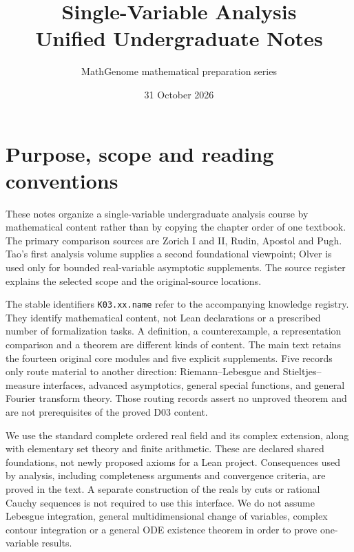 \documentclass[11pt,oneside,a4paper]{book}
\theoremstyle{definition}
\theoremstyle{remark}
\begin{document}
\frontmatter
\title{Single-Variable Analysis\\Unified Undergraduate Notes}
\author{MathGenome mathematical preparation series}
\date{31 October 2026}
\hypersetup{pageanchor=false}
\maketitle
\clearpage
{}
\hypersetup{pageanchor=true}

\chapter*{Purpose, scope and reading conventions}
These notes organize a single-variable undergraduate analysis course by mathematical
content rather than by copying the chapter order of one textbook. The primary
comparison sources are Zorich I and II, Rudin, Apostol and Pugh. Tao's first
analysis volume supplies a second foundational viewpoint; Olver is used only
for bounded real-variable asymptotic supplements. The source register explains
the selected scope and the original-source locations.

The stable identifiers \texttt{K03.xx.name} refer to the accompanying knowledge
registry. They identify mathematical content, not Lean declarations or a prescribed
number of formalization tasks. A definition, a counterexample, a representation
comparison and a theorem are different kinds of content. The main text retains
the fourteen original core modules and five explicit supplements. Five records
only route material to another direction: Riemann--Lebesgue and Stieltjes--measure
interfaces, advanced asymptotics, general special functions, and general Fourier
transform theory. Those routing records assert no unproved theorem and are not
prerequisites of the proved D03 content.

We use the standard complete ordered real field and its complex extension, along
with elementary set theory and finite arithmetic. These are declared shared
foundations, not newly proposed axioms for a Lean project. Consequences used by
analysis, including completeness arguments and convergence criteria, are proved
in the text. A separate construction of the reals by cuts or rational Cauchy
sequences is not required to use this interface. We do not assume Lebesgue
integration, general multidimensional change of variables, complex contour
integration or a general ODE existence theorem in order to prove one-variable
results.
\end{document}

